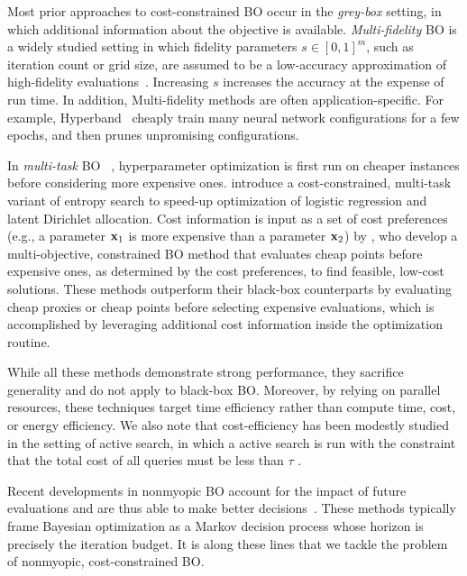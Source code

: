 Most prior approaches to cost-constrained BO occur in the \textit{grey-box} setting, in which additional information about the objective is available. 
\textit{Multi-fidelity} BO is a widely studied setting in which fidelity parameters $s \in [0, 1]^m$, such as iteration count or grid size, are assumed to be a low-accuracy approximation of high-fidelity evaluations~\citep{forrester2007multi, kandasamy2017multi, poloczek2017multi, wu2019practical}. 
Increasing $s$ increases the accuracy at the expense of run time. 
In addition, Multi-fidelity methods are often application-specific. 
For example, Hyperband~\citep{li2017hyperband, falkner2018bohb, klein2016fast, klein2017fastbo} cheaply train many neural network configurations for a few epochs, and then prunes unpromising configurations. 

In \textit{multi-task} BO ~\citep{swersky2013multi}, hyperparameter optimization is first run on cheaper instances before considering more expensive ones. 
\citet{swersky2013multi} introduce a cost-constrained, multi-task variant of entropy search to speed-up optimization of logistic regression and latent Dirichlet allocation. 
Cost information is input as a set of cost preferences (e.g., a parameter ${\mathbf{x}}_1$ is more expensive than a parameter ${\mathbf{x}}_2$) by \citet{abdolshah2019costaware}, who develop a multi-objective, constrained BO method that evaluates cheap points before expensive ones, as determined by the cost preferences, to find feasible, low-cost solutions. 
These methods outperform their black-box counterparts by evaluating cheap proxies or cheap points before selecting expensive evaluations, which is accomplished by leveraging additional cost information inside the optimization routine. 

While all these methods demonstrate strong performance, they sacrifice generality and do not apply to black-box BO. 
Moreover, by relying on parallel resources, these techniques target time efficiency rather than compute time, cost, or energy efficiency. We also note that cost-efficiency has been modestly studied in the setting of active search, in which a active search is run with the constraint that the total cost of all queries must be less than $\tau$ \cite{jiang2019cost}.

Recent developments in nonmyopic BO account for the impact of future evaluations and are thus able to make better decisions~\citep{lam2016bayesian, lam2017lookahead, frazier2018, yue2019lookahead, lee2020efficient, jiang2020efficient}. These methods typically frame Bayesian optimization as a Markov decision process whose horizon is precisely the iteration budget. It is along these lines that we tackle the problem of nonmyopic, cost-constrained BO.   